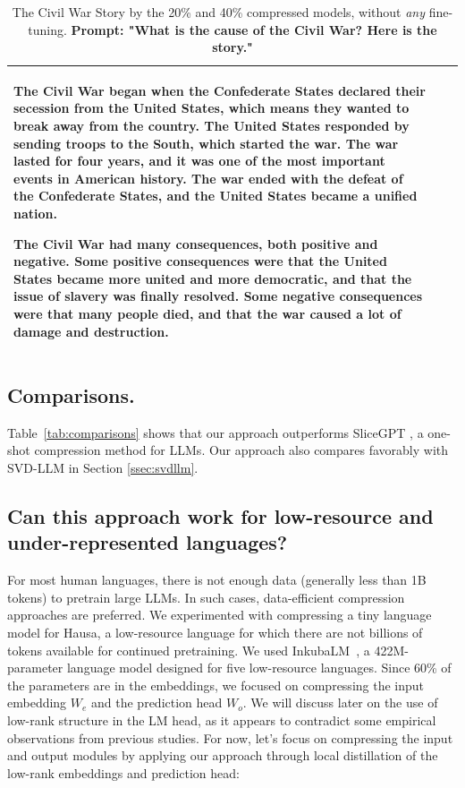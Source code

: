 \begin{table}
\begin{tabular}{ p{} | p{} | p{} }
The Civil War began when the Confederate States declared their secession from the United States, which means they wanted to break away from the country. The United States responded by sending troops to the South, which started the war. The war lasted for four years, and it was one of the most important events in American history. The war ended with the defeat of the Confederate States, and the United States became a unified nation.

The Civil War had many consequences, both positive and negative. Some positive consequences were that the United States became more united and more democratic, and that the issue of slavery was finally resolved. Some negative consequences were that many people died, and that the war caused a lot of damage and destruction.
\\
\bottomrule
\end{tabular}
\caption{The Civil War Story by the 20\% and 40\% compressed models, without \textit{any} fine-tuning. \textbf{Prompt: "What is the cause of the Civil War? Here is the story."}}
\label{tab:cw}
\end{table}

\subsection{Comparisons.}
Table~\ref{tab:comparisons} shows that our approach outperforms SliceGPT \citep{ashkboos_slicegpt_2024}, a one-shot compression method for LLMs. Our approach also compares favorably with SVD-LLM \citep{svdllm} in Section \ref{ssec:svdllm}.

\subsection{Can this approach work for low-resource and under-represented languages?}
\label{sec:hausa-ch2}

For most human languages, there is not enough data (generally less than 1B tokens) to pretrain large LLMs. In such cases, data-efficient compression approaches are preferred. We experimented with compressing a tiny language model for Hausa, a low-resource language for which there are not billions of tokens available for continued pretraining. We used InkubaLM~\citep{tonja2024inkubalm}, a 422M-parameter language model designed for five low-resource languages. Since 60\% of the parameters are in the embeddings, we focused on compressing the input embedding $W_{e}$ and the prediction head $W_{o}$. We will discuss later on the use of low-rank structure in the LM head, as it appears to contradict some empirical observations from previous studies. For now, let's focus on compressing the input and output modules by applying our approach through local distillation of the low-rank embeddings and prediction head:

